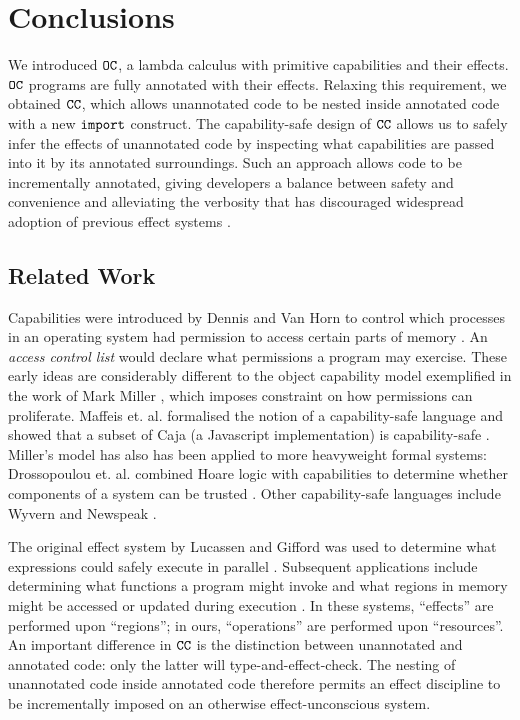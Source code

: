 
\section{Conclusions}

We introduced $\mathtt{OC}$, a lambda calculus with primitive capabilities and their effects. $\mathtt{OC}$ programs are fully annotated with their effects. Relaxing this requirement, we obtained $\mathtt{CC}$, which allows unannotated code to be nested inside annotated code with a new $\mathtt{import}$ construct. The capability-safe design of $\mathtt{CC}$ allows us to safely infer the effects of unannotated code by inspecting what capabilities are passed into it by its annotated surroundings. Such an approach allows code to be incrementally annotated, giving developers a balance between safety and convenience and alleviating the verbosity that has discouraged widespread adoption of previous effect systems \cite{rytz12}.

\subsection{Related Work}

Capabilities were introduced by Dennis and Van Horn to control which processes in an operating system had permission to access certain parts of memory \cite{dennis66}. An \textit{access control list} would declare what permissions a program may exercise. These early ideas are considerably different to the object capability model exemplified in the work of Mark Miller \cite{miller06}, which imposes constraint on how permissions can proliferate. Maffeis et. al. formalised the notion of a capability-safe language and showed that a subset of Caja (a Javascript implementation) is capability-safe \cite{maffeis10}. Miller's model has also has been applied to more heavyweight formal systems: Drossopoulou et. al. combined Hoare logic with capabilities to determine whether components of a system can be trusted \cite{drossopoulou07}. Other capability-safe languages include Wyvern \cite{nistor13} and Newspeak \cite{bracha10}.

The original effect system by Lucassen and Gifford was used to determine what expressions could safely execute in parallel \cite{lucassen88}. Subsequent applications include determining what functions a program might invoke \cite{tang94} and what regions in memory might be accessed or updated during execution \cite{talpin94}. In these systems, ``effects'' are performed upon ``regions''; in ours, ``operations'' are performed upon ``resources''. An important difference in $\mathtt{CC}$ is the distinction between unannotated and annotated code: only the latter will type-and-effect-check. The nesting of unannotated code inside annotated code therefore permits an effect discipline to be incrementally imposed on an otherwise effect-unconscious system.

